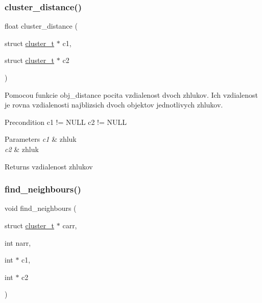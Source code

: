 \subsubsection{\texorpdfstring{cluster\+\_\+distance()}{cluster\_distance()}}
{\footnotesize\ttfamily float cluster\+\_\+distance (\begin{DoxyParamCaption}\item[{struct \hyperlink{structcluster__t}{cluster\+\_\+t} $\ast$}]{c1,  }\item[{struct \hyperlink{structcluster__t}{cluster\+\_\+t} $\ast$}]{c2 }\end{DoxyParamCaption})}

Pomocou funkcie \textquotesingle{}obj\+\_\+distance\textquotesingle{} pocita vzdialenost dvoch zhlukov. Ich vzdialenost je rovna vzdialenosti najblizsich dvoch objektov jednotlivych zhlukov.

\begin{DoxyPrecond}{Precondition}
c1 != N\+U\+LL c2 != N\+U\+LL
\end{DoxyPrecond}

\begin{DoxyParams}{Parameters}
{\em c1} & zhluk \\
\hline
{\em c2} & zhluk \\
\hline
\end{DoxyParams}
\begin{DoxyReturn}{Returns}
vzdialenost zhlukov 
\end{DoxyReturn}
\mbox{\label{group__clusts_ga5f16d682e7c859f7bd3f27697c2b7cc0}} 
\subsubsection{\texorpdfstring{find\+\_\+neighbours()}{find\_neighbours()}}
{\footnotesize\ttfamily void find\+\_\+neighbours (\begin{DoxyParamCaption}\item[{struct \hyperlink{structcluster__t}{cluster\+\_\+t} $\ast$}]{carr,  }\item[{int}]{narr,  }\item[{int $\ast$}]{c1,  }\item[{int $\ast$}]{c2 }\end{DoxyParamCaption})}

